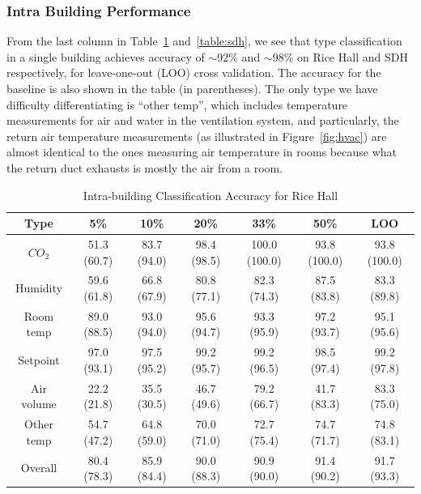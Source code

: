 \subsubsection{Intra Building Performance}
From the last column in Table~\ref{table:rice} and~\ref{table:sdh}, we see that type classification in a single building achieves accuracy of $\sim$92\% and $\sim$98\% on Rice Hall 
and SDH respectively, for leave-one-out (LOO) cross validation. The accuracy for the baseline is also shown in the table (in parentheses). The only type we have difficulty differentiating is ``other temp'', which includes 
temperature measurements for air and water in the ventilation system, and particularly, the return air temperature measurements (as illustrated in Figure~\ref{fig:hvac}) are 
almost identical to the ones measuring air temperature in rooms because what the return duct exhausts is mostly the air from a room.

\begin{table}[ht!]
\centering %
\begin{tabular}{c | c | c | c | c | c | c}%
\hline %
Type & 5\% & 10\% & 20\% & 33\% & 50\% & LOO\\ %
\hline\hline %
$CO_{2}$ & 51.3 (60.7) & 83.7 (94.0) & 98.4 (98.5) & 100.0 (100.0) & 93.8 (100.0) & 93.8 (100.0)\\ \hline
Humidity & 59.6 (61.8) & 66.8 (67.9) & 80.8 (77.1) & 82.3 (74.3) & 87.5 (83.8) & 83.3 (89.8)\\ \hline
Room temp & 89.0 (88.5) & 93.0 (94.0) & 95.6 (94.7) & 93.3 (95.9) & 97.2 (93.7) & 95.1 (95.6)\\ \hline
Setpoint & 97.0 (93.1) & 97.5 (95.2) & 99.2 (95.7) & 99.2 (96.5) & 98.5 (97.4) & 99.2 (97.8)\\ \hline
Air volume & 22.2 (21.8) & 35.5 (30.5) & 46.7 (49.6) & 79.2 (66.7) & 41.7 (83.3) & 83.3 (75.0)\\ \hline
Other temp & 54.7 (47.2) & 64.8 (59.0) & 70.0 (71.0) & 72.7 (75.4) & 74.7 (71.7) & 74.8 (83.1)\\ \hline
Overall & 80.4 (78.3) & 85.9 (84.4) & 90.0 (88.3) & 90.9 (90.0) & 91.4 (90.2) & 91.7 (93.3)\\ \hline
\end{tabular}
\caption{Intra-building Classification Accuracy for Rice Hall}
\label{table:rice} %
\end{table}

